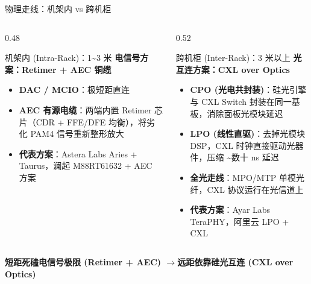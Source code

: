 \documentclass[aspectratio=169, 10pt, UTF8]{ctexbeamer}
\begin{document}
\begin{frame}{物理走线：机架内 vs 跨机柜}
  \begin{columns}[T]
    \begin{column}{0.48\textwidth}
      \begin{block}{机架内 (Intra-Rack)：1\textasciitilde3 米}
        \textbf{电信号方案：Retimer + AEC 铜缆}
        \begin{itemize}
          \item \textbf{DAC / MCIO}：极短距直连
          \item \textbf{AEC 有源电缆}：两端内置 Retimer 芯片（CDR + FFE/DFE 均衡），将劣化 PAM4 信号重新整形放大
          \item \textbf{代表方案}：Astera Labs Aries + Taurus，澜起 M88RT61632 + AEC 方案
        \end{itemize}
      \end{block}
    \end{column}
    \begin{column}{0.52\textwidth}
      \begin{alertblock}{跨机柜 (Inter-Rack)：3 米以上}
        \textbf{光互连方案：CXL over Optics}
        \begin{itemize}
          \item \textbf{CPO (光电共封装)}：硅光引擎与 CXL Switch 封装在同一基板，消除面板光模块延迟
          \item \textbf{LPO (线性直驱)}：去掉光模块 DSP，CXL 时钟直接驱动光器件，压缩 {\textasciitilde}数十 ns 延迟
          \item \textbf{全光走线}：MPO/MTP 单模光纤，CXL 协议运行在光信道上
          \item \textbf{代表方案}：Ayar Labs TeraPHY，阿里云 LPO + CXL
        \end{itemize}
      \end{alertblock}
    \end{column}
  \end{columns}

  \vspace{6pt}
  \begin{center}
    \textbf{短距死磕电信号极限 (Retimer + AEC) \quad$\longrightarrow$\quad 远距依靠硅光互连 (CXL over Optics)}
  \end{center}
\end{frame}
\end{document}
